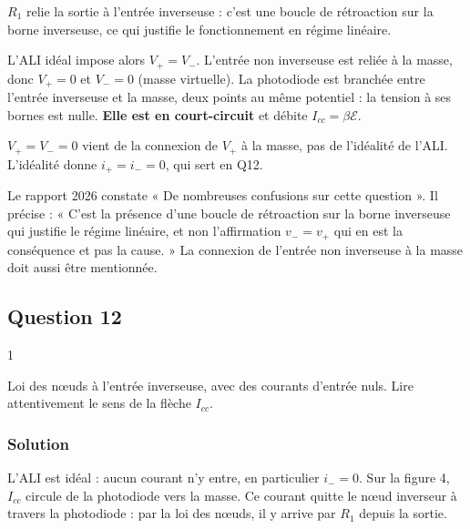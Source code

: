 \documentclass[11pt,a4paper]{article}
\begin{document}
\(R_1\) relie la sortie à l'entrée inverseuse : c'est une boucle de rétroaction sur la borne inverseuse, ce qui justifie le fonctionnement en régime linéaire.

L'ALI idéal impose alors \(V_+=V_-\). L'entrée non inverseuse est reliée à la masse, donc \(V_+=0\) et \(V_-=0\) (masse virtuelle). La photodiode est branchée entre l'entrée inverseuse et la masse, deux points au même potentiel : la tension à ses bornes est nulle. \textbf{Elle est en court-circuit} et débite \(I_{cc}=\beta\mathcal E\).

\begin{piege}

\(V_+=V_-=0\) vient de la connexion de \(V_+\) à la masse, pas de l'idéalité de l'ALI. L'idéalité donne \(i_+=i_-=0\), qui sert en Q12.

\end{piege}

\begin{jury}

Le rapport 2026 constate « De nombreuses confusions sur cette question ». Il précise : « C'est la présence d'une boucle de rétroaction sur la borne inverseuse qui justifie le régime linéaire, et non l'affirmation \(v_- = v_+\) qui en est la conséquence et pas la cause. » La connexion de l'entrée non inverseuse à la masse doit aussi être mentionnée.

\end{jury}

\hypertarget{question-12}{%
\subsection{Question 12}\label{question-12}}

\begin{indication}{1}

Loi des nœuds à l'entrée inverseuse, avec des courants d'entrée nuls. Lire attentivement le sens de la flèche \(I_{cc}\).

\end{indication}

\hypertarget{solution-11}{%
\subsubsection{Solution}\label{solution-11}}

L'ALI est idéal : aucun courant n'y entre, en particulier \(i_-=0\). Sur la figure 4, \(I_{cc}\) circule de la photodiode vers la masse. Ce courant quitte le nœud inverseur à travers la photodiode : par la loi des nœuds, il y arrive par \(R_1\) depuis la sortie.
\end{document}
